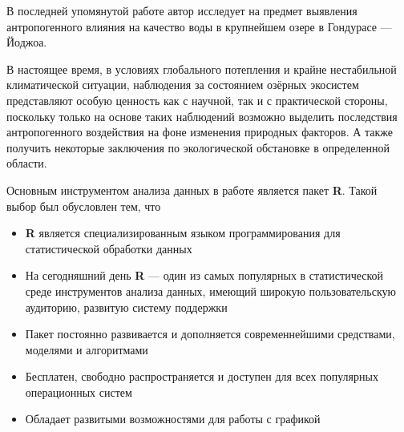 В последней упомянутой работе \cite{Chokshi2006} автор исследует на предмет выявления антропогенного влияния на качество воды в крупнейшем озере в Гондурасе --- Йоджоа.

В настоящее время, в условиях глобального потепления и крайне нестабильной климатической ситуации, наблюдения за состоянием озёрных экосистем представляют особую ценность как с научной, так и с практической стороны, поскольку только на основе таких наблюдений возможно выделить последствия антропогенного воздействия на фоне изменения природных факторов. А также получить некоторые заключения по экологической обстановке в определенной области.

Основным инструментом анализа данных в работе является пакет \textbf{R}. Такой выбор был обусловлен тем, что
\begin{itemize}
  \item \textbf{R} является специализированным языком программирования для статистической обработки данных
  \item На сегодняшний день \textbf{R} --- один из самых популярных в статистической среде инструментов анализа данных, имеющий широкую пользовательскую аудиторию, развитую систему поддержки
  \item Пакет постоянно развивается и дополняется современнейшими средствами, моделями и алгоритмами
  \item Бесплатен, свободно распространяется и доступен для всех популярных операционных систем
  \item Обладает развитыми возможностями для работы с графикой
\end{itemize}

